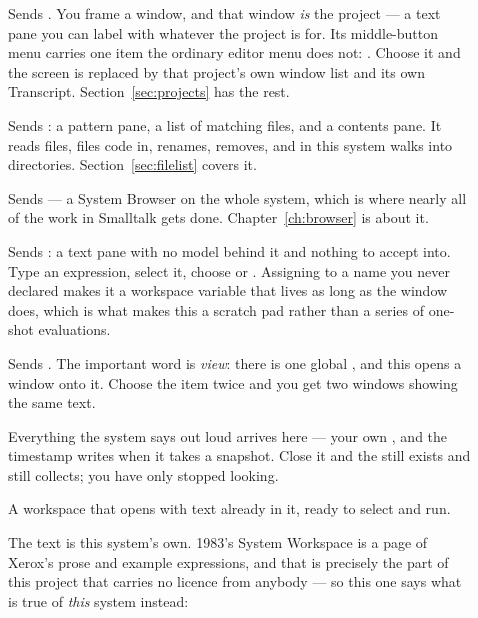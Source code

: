 \begin{description}

\item[] Sends . You frame a window, and that
window \emph{is} the project --- a text pane you can label with whatever the
project is for. Its middle-button menu carries one item the ordinary editor
menu does not: . Choose it and the screen is replaced by that
project's own window list and its own Transcript.
Section~\ref{sec:projects} has the rest.

\item[] Sends : a pattern pane, a list of
matching files, and a contents pane. It reads files, files code in, renames,
removes, and in this system walks into directories.
Section~\ref{sec:filelist} covers it.

\item[] Sends  --- a
System Browser on the whole system, which is where nearly all of the work in
Smalltalk gets done. Chapter~\ref{ch:browser} is about it.

\item[] Sends : a text pane with no
model behind it and nothing to accept into. Type an expression, select it,
choose  or . Assigning to a name you never declared
makes it a workspace variable that lives as long as the window does, which is
what makes this a scratch pad rather than a series of one-shot evaluations.

\item[] Sends
. The
important word is \emph{view}: there is one global , and this
opens a window onto it. Choose the item twice and you get two windows showing
the same text.

Everything the system says out loud arrives here --- your own
, and the timestamp  writes when it takes a
snapshot. Close it and the  still exists and still collects;
you have only stopped looking.

\item[] A workspace that opens with text already in it,
ready to select and run.

The text is this system's own. 1983's System Workspace is a page of Xerox's
prose and example expressions, and that is precisely the part of this project
that carries no licence from anybody --- so this one says what is true of
\emph{this} system instead:


\end{description}
